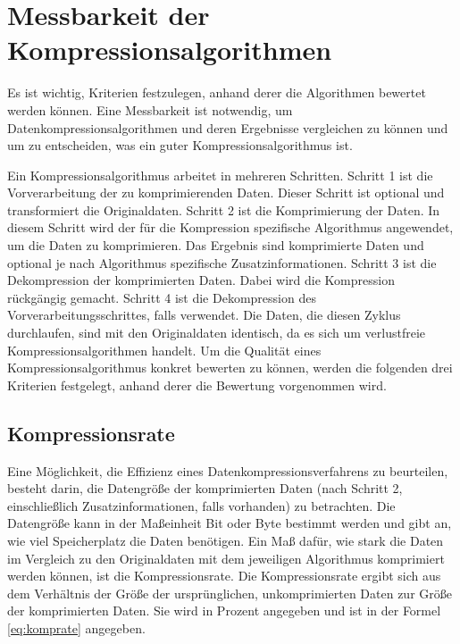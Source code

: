 \documentclass[conference]{IEEEtran}
\begin{document}

\section{Messbarkeit der Kompressionsalgorithmen}

Es ist wichtig, Kriterien festzulegen, anhand derer die Algorithmen bewertet werden können.
Eine Messbarkeit ist notwendig, um Datenkompressionsalgorithmen und deren Ergebnisse
vergleichen zu können und um zu entscheiden, was ein guter Kompressionsalgorithmus ist.

Ein Kompressionsalgorithmus arbeitet in mehreren Schritten. 
Schritt 1 ist die Vorverarbeitung der zu komprimierenden Daten. 
Dieser Schritt ist optional und transformiert die Originaldaten. 
Schritt 2 ist die Komprimierung der Daten. 
In diesem Schritt wird der für die Kompression spezifische Algorithmus angewendet,
um die Daten zu komprimieren.
Das Ergebnis sind komprimierte Daten und optional je nach Algorithmus spezifische 
Zusatzinformationen. 
Schritt 3 ist die Dekompression der komprimierten Daten. 
Dabei wird die Kompression rückgängig gemacht. 
Schritt 4 ist die Dekompression des Vorverarbeitungsschrittes, falls verwendet. 
Die Daten, die diesen Zyklus durchlaufen, sind mit den Originaldaten identisch, da 
es sich um verlustfreie Kompressionsalgorithmen handelt. 
Um die Qualität eines Kompressionsalgorithmus konkret bewerten zu können, werden 
die folgenden drei Kriterien festgelegt, anhand derer die Bewertung vorgenommen wird.


\subsection{Kompressionsrate}

Eine Möglichkeit, die Effizienz eines Datenkompressionsverfahrens zu beurteilen, 
besteht darin, die Datengröße der komprimierten Daten (nach Schritt 2, einschließlich 
Zusatzinformationen, falls vorhanden) zu betrachten. 
Die Datengröße kann in der Maßeinheit Bit oder Byte bestimmt werden und gibt an, wie 
viel Speicherplatz die Daten benötigen. 
Ein Maß dafür, wie stark die Daten im Vergleich zu den Originaldaten mit dem 
jeweiligen Algorithmus komprimiert werden können, ist die Kompressionsrate. 
Die Kompressionsrate ergibt sich aus dem Verhältnis der Größe der ursprünglichen, 
unkomprimierten Daten zur Größe der komprimierten Daten.
Sie wird in Prozent angegeben und ist in der Formel \ref{eq:komprate} angegeben.
\end{document}
